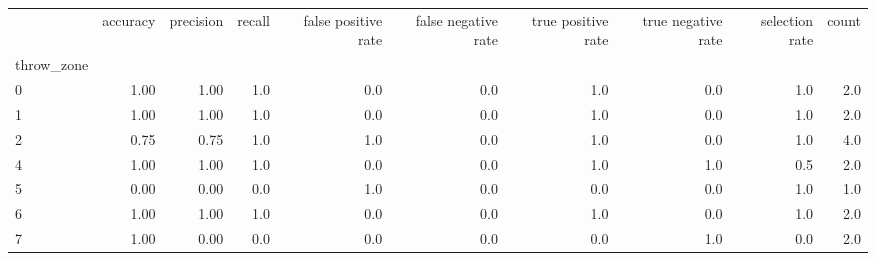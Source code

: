 \begin{tabular}{lrrrrrrrrr}
\toprule
{} &  accuracy &  precision &  recall &  false positive rate &  false negative rate &  true positive rate &  true negative rate &  selection rate &  count \\
throw\_zone &           &            &         &                      &                      &                     &                     &                 &        \\
\midrule
0          &      1.00 &       1.00 &     1.0 &                  0.0 &                  0.0 &                 1.0 &                 0.0 &             1.0 &    2.0 \\
1          &      1.00 &       1.00 &     1.0 &                  0.0 &                  0.0 &                 1.0 &                 0.0 &             1.0 &    2.0 \\
2          &      0.75 &       0.75 &     1.0 &                  1.0 &                  0.0 &                 1.0 &                 0.0 &             1.0 &    4.0 \\
4          &      1.00 &       1.00 &     1.0 &                  0.0 &                  0.0 &                 1.0 &                 1.0 &             0.5 &    2.0 \\
5          &      0.00 &       0.00 &     0.0 &                  1.0 &                  0.0 &                 0.0 &                 0.0 &             1.0 &    1.0 \\
6          &      1.00 &       1.00 &     1.0 &                  0.0 &                  0.0 &                 1.0 &                 0.0 &             1.0 &    2.0 \\
7          &      1.00 &       0.00 &     0.0 &                  0.0 &                  0.0 &                 0.0 &                 1.0 &             0.0 &    2.0 \\
\bottomrule
\end{tabular}
